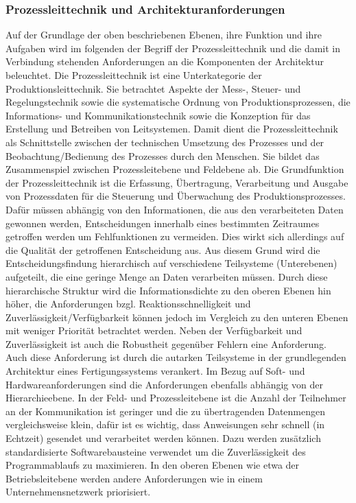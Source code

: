 \subsubsection{Prozessleittechnik und Architekturanforderungen}
Auf der Grundlage der oben beschriebenen Ebenen, ihre Funktion und ihre Aufgaben wird im folgenden der Begriff der Prozessleittechnik und die damit in Verbindung stehenden Anforderungen an die Komponenten der Architektur beleuchtet. 
Die Prozessleittechnik ist eine Unterkategorie der Produktionsleittechnik. Sie betrachtet Aspekte der Mess-, Steuer- und Regelungstechnik sowie die systematische Ordnung von Produktionsprozessen, die Informations- und Kommunikationstechnik sowie die Konzeption für das Erstellung und Betreiben von Leitsystemen. Damit dient die Prozessleittechnik als Schnittstelle zwischen der technischen Umsetzung des Prozesses und der Beobachtung/Bedienung des Prozesses durch den Menschen. Sie bildet das Zusammenspiel zwischen Prozessleitebene und Feldebene ab. 
Die Grundfunktion der Prozessleittechnik ist die Erfassung, Übertragung, Verarbeitung und Ausgabe von Prozessdaten für die Steuerung und Überwachung des Produktionsprozesses. Dafür müssen abhängig von den Informationen, die aus den verarbeiteten Daten gewonnen werden, Entscheidungen innerhalb eines bestimmten Zeitraumes getroffen werden um Fehlfunktionen zu vermeiden. Dies wirkt sich allerdings auf die Qualität der getroffenen Entscheidung aus. Aus diesem Grund wird die Entscheidungsfindung hierarchisch auf verschiedene Teilsysteme (Unterebenen) aufgeteilt, die eine geringe Menge an Daten verarbeiten müssen. Durch diese hierarchische Struktur wird die Informationsdichte zu den oberen Ebenen hin höher, die Anforderungen bzgl. Reaktionsschnelligkeit und Zuverlässigkeit/Verfügbarkeit können jedoch im Vergleich zu den unteren Ebenen mit weniger Priorität betrachtet werden. 
Neben der Verfügbarkeit und Zuverlässigkeit ist auch die Robustheit gegenüber Fehlern eine Anforderung. Auch diese Anforderung ist durch die autarken Teilsysteme in der grundlegenden Architektur eines Fertigungssystems verankert.
Im Bezug auf Soft- und Hardwareanforderungen sind die Anforderungen ebenfalls abhängig von der Hierarchieebene. In der Feld- und Prozessleitebene ist die Anzahl der Teilnehmer an der Kommunikation ist geringer und die zu übertragenden Datenmengen vergleichsweise klein, dafür ist es wichtig, dass Anweisungen sehr schnell (in Echtzeit) gesendet und verarbeitet werden können. Dazu werden zusätzlich standardisierte Softwarebausteine verwendet um die Zuverlässigkeit des Programmablaufs zu maximieren. 
In den oberen Ebenen wie etwa der Betriebsleitebene werden andere Anforderungen wie in einem Unternehmensnetzwerk priorisiert\citep{Linke2017}. 

